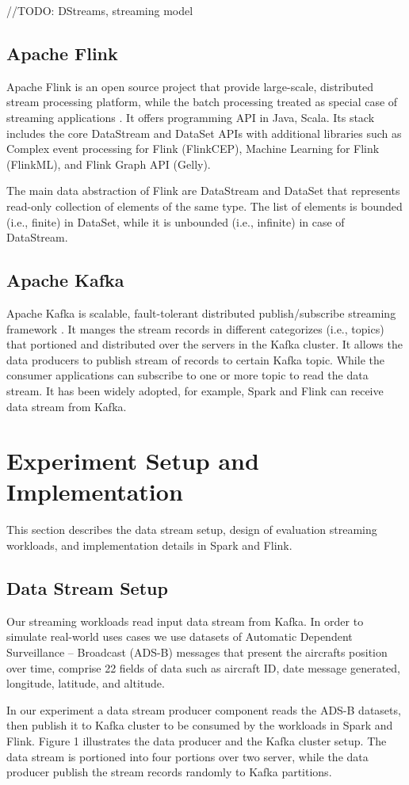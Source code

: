 \documentclass[]{article}
\begin{document}
//TODO: DStreams, streaming model

\subsection{Apache Flink}

Apache Flink is an open source project that provide large-scale, distributed stream processing platform, while the batch processing treated as special case of streaming applications \cite{flink}.
It offers programming API in Java, Scala. Its stack includes the core DataStream and DataSet APIs with additional libraries such as Complex event processing for Flink (FlinkCEP), Machine Learning for Flink (FlinkML), and Flink Graph API (Gelly).

The main data abstraction of Flink are DataStream and DataSet that represents read-only collection of elements of the same type. The list of elements is bounded (i.e., finite) in DataSet, while it is unbounded (i.e., infinite) in case of DataStream.


\subsection{Apache Kafka}
Apache Kafka is scalable, fault-tolerant distributed publish/subscribe streaming framework \cite{kafka}.
It manges the stream records in different categorizes (i.e., topics) that portioned and distributed over the servers in the Kafka cluster. It allows the data producers to publish stream of records to certain Kafka topic. While the consumer applications can subscribe to one or more topic to read the data stream. It has been widely  adopted, for example, 
Spark and Flink can receive data stream from Kafka. 


\section{Experiment Setup and Implementation}
This section describes the data stream setup, design of evaluation streaming workloads, and implementation details in Spark and Flink.

\subsection{Data Stream Setup}
Our streaming workloads read input data stream from Kafka. In order to simulate real-world uses cases we use datasets of Automatic Dependent Surveillance – Broadcast (ADS-B) messages that present the aircrafts position over time, comprise 22 fields of data such as aircraft ID, date message generated, longitude, latitude, and altitude.
\par In our experiment a data stream producer component reads the ADS-B datasets, then publish it to Kafka cluster to be consumed by the workloads in Spark and Flink. Figure 1 illustrates the data producer and the Kafka cluster setup.
The data stream is portioned into four portions over two server, while the data producer publish the stream records randomly to Kafka partitions.
\end{document}
